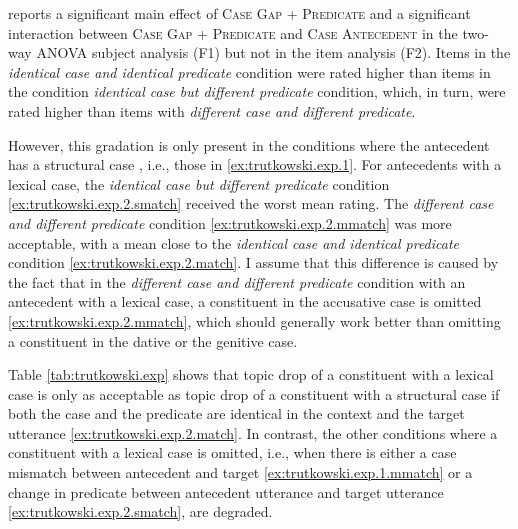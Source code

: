 \noindent\citet{trutkowski2018} reports a significant main effect of \textsc{Case Gap + Predicate} and a significant interaction between \textsc{Case Gap + Predicate} and \textsc{Case Antecedent} in the two-way ANOVA subject analysis (F1) but not in the item analysis (F2).
Items in the \textit{identical case and identical predicate} condition were rated higher than items in the condition \textit{identical case but different predicate} condition, which, in turn, were rated higher than items with \textit{different case and different predicate}.

However, this gradation is only present in the conditions where the antecedent  has a structural case  , i.e., those in \ref{ex:trutkowski.exp.1}.
For antecedents with a lexical case,  the \textit{identical case but different predicate} condition \ref{ex:trutkowski.exp.2.smatch} received the worst mean rating.
The \textit{different case and different predicate} condition \ref{ex:trutkowski.exp.2.mmatch} was more acceptable, with a mean close to the \textit{identical case and identical predicate} condition \ref{ex:trutkowski.exp.2.match}.
I assume that this difference is caused by the fact that in the \textit{different case and different predicate} condition with an antecedent  with a lexical case,  a constituent in the accusative case is omitted \ref{ex:trutkowski.exp.2.mmatch}, which should generally work better than omitting a constituent in the dative  or the genitive case. 

Table \ref{tab:trutkowski.exp} shows that topic drop of a constituent with a lexical case  is only as acceptable as topic drop of a constituent with a structural case  if both the case and the predicate are identical in the context and the target utterance \ref{ex:trutkowski.exp.2.match}.
In contrast, the other conditions where a constituent with a lexical case  is omitted, i.e., when there is either a case mismatch between antecedent  and target \ref{ex:trutkowski.exp.1.mmatch} or a change in predicate between antecedent utterance and target utterance \ref{ex:trutkowski.exp.2.smatch}, are degraded.


